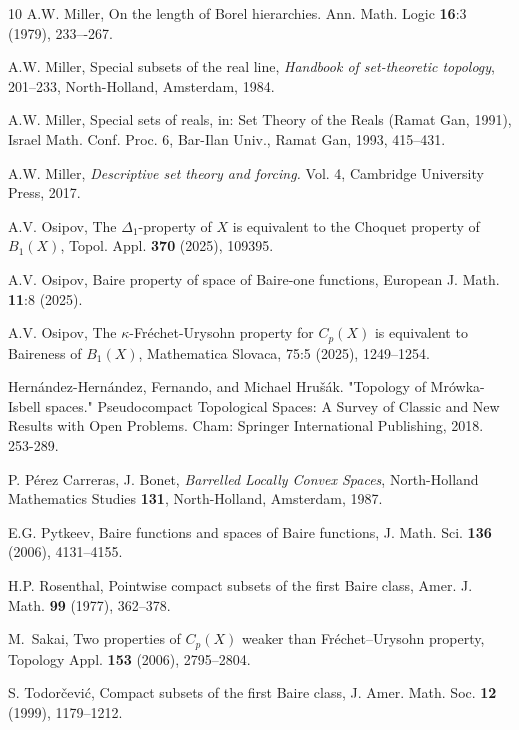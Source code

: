 \documentclass[preprint,11pt]{elsarticle}
\numberwithin{equation}{section}
\numberwithin{theorem}{section}
\begin{document}
\begin{thebibliography}{10}
A.W. Miller, On the length of Borel hierarchies. Ann. Math. Logic \textbf{16}:3 (1979), 233–-267.


A.W. Miller, Special subsets of the real line, {\em Handbook of set-theoretic topology}, 201--233, North-Holland, Amsterdam, 1984.

A.W. Miller, Special sets of reals, in: Set Theory of the Reals (Ramat Gan, 1991), Israel Math. Conf. Proc. 6, Bar-Ilan Univ., Ramat Gan, 1993, 415--431.

A.W. Miller,  {\em Descriptive set theory and forcing.} Vol. 4, Cambridge University Press, 2017.

A.V. Osipov, The $\Delta_1$-property of $X$ is equivalent to the Choquet property of $B_1(X)$, Topol. Appl. \textbf{370} (2025), 109395.

A.V. Osipov, Baire property of space of Baire-one functions, European J. Math. \textbf{11}:8 (2025).

A.V. Osipov, The $\kappa$-Fr\'{e}chet-Urysohn property for $C_p(X)$ is equivalent to Baireness of $B_1(X)$, Mathematica Slovaca, 75:5 (2025), 1249--1254.

Hernández-Hernández, Fernando, and Michael Hrušák. "Topology of Mrówka-Isbell spaces." Pseudocompact Topological Spaces: A Survey of Classic and New Results with Open Problems. Cham: Springer International Publishing, 2018. 253-289.


P. P\'{e}rez Carreras, J. Bonet, \emph{Barrelled Locally Convex Spaces}, North-Holland Mathematics Studies \textbf{131}, North-Holland, Amsterdam, 1987.

E.G. Pytkeev,  Baire functions and spaces of Baire functions, J. Math. Sci. \textbf{136} (2006), 4131--4155.

H.P. Rosenthal, Pointwise compact subsets of the first Baire class, Amer. J. Math. \textbf{99} (1977), 362--378.

M.~Sakai, Two properties of $C_p(X)$ weaker than Fr\'{e}chet--Urysohn property, Topology Appl. \textbf{153} (2006), 2795--2804.



S. Todor\v{c}evi\'{c}, Compact subsets of the first Baire class, J. Amer. Math. Soc. \textbf{12} (1999), 1179--1212.


\end{thebibliography}
\end{document}
